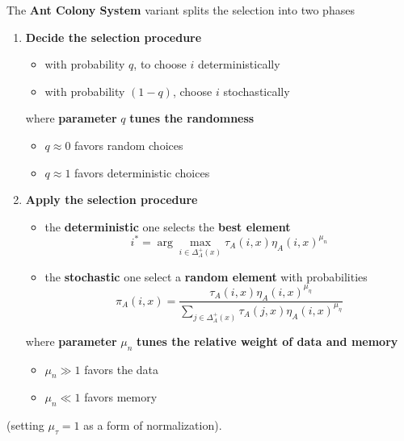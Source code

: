 \documentclass[11pt]{article}
\begin{document}
	The \textbf{Ant Colony System} variant splits the selection into two phases
	\begin{enumerate}
		\item \textbf{Decide the selection procedure}
		\begin{itemize}
			\item with probability $q$, to choose $i$ deterministically
			
			\item with probability $(1 − q)$, choose $i$ stochastically
		\end{itemize}
		
		where \textbf{parameter} $q$ \textbf{tunes the randomness}
		\begin{itemize}
			\item $q \approx 0$ favors random choices
			
			\item $q \approx 1$ favors deterministic choices
		\end{itemize}
		\nn
		
		\item \textbf{Apply the selection procedure}
		\begin{itemize}
			\item the \textbf{deterministic} one selects the \textbf{best element}
			$$ i^\ast = \arg \max_{i \in \Delta_A^+ (x)} \tau_A (i, x) \eta_A (i, x)^{\mu_n } $$
			
			\item the \textbf{stochastic} one select a \textbf{random element} with probabilities
			$$ \pi_A (i,x) = \frac{ \tau_A (i, x) \eta_A (i, x)^{\mu_{\eta} } }{ \sum_{j \in \Delta_A^+ (x)} \tau_A (j, x) \eta_A (i,x)^{\mu_{\eta} } } $$
		\end{itemize}
		
		where \textbf{parameter} $\mu_n$ \textbf{tunes the relative weight of data and memory}
		\begin{itemize}
			\item $\mu_n \gg 1$ favors the data
			
			\item $\mu_n \ll 1$ favors memory
		\end{itemize}
	\end{enumerate}
	(setting $\mu_{\tau} = 1$ as a form of normalization).\\
	
	\newpage
	
\end{document}
